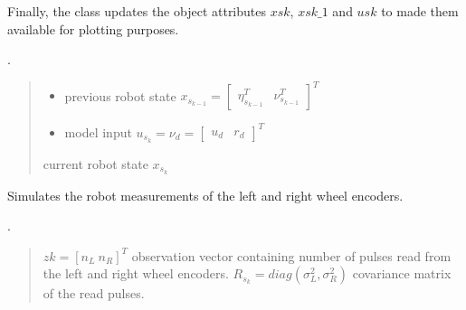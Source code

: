 \documentclass[letterpaper,10pt,english]{sphinxmanual}
\begin{document}
\begin{fulllineitems}
\begin{fulllineitems}
\sphinxAtStartPar
Finally, the class updates the object attributes \(xsk\), \(xsk\_1\) and  \(usk\) to made them available for plotting purposes.

\sphinxAtStartPar
{}.
\begin{quote}\begin{description}
\begin{itemize}
\item {} 
\sphinxAtStartPar
{} \textendash{} previous robot state \(x_{s_{k-1}}=\begin{bmatrix}\eta_{s_{k-1}}^T & \nu_{s_{k-1}}^T\end{bmatrix}^T\)

\item {} 
\sphinxAtStartPar
{} \textendash{} model input \(u_{s_k}=\nu_{d}=\begin{bmatrix} u_d& r_d\end{bmatrix}^T\)

\end{itemize}

\sphinxAtStartPar
current robot state \(x_{s_k}\)

\end{description}\end{quote}

\end{fulllineitems}


\begin{fulllineitems}
\label{\detokenize{robot_simulation:DifferentialDriveSimulatedRobot.DifferentialDriveSimulatedRobot.ReadEncoders}}
\pysigstartsignatures
{}
\pysigstopsignatures
\sphinxAtStartPar
Simulates the robot measurements of the left and right wheel encoders.

\sphinxAtStartPar
{}.
\begin{quote}\begin{description}
\sphinxAtStartPar
\(zk=[n_L~n_R]^T\) observation vector containing number of pulses read from the left and right wheel encoders. \(R_{s_k}=diag(\sigma_L^2,\sigma_R^2)\) covariance matrix of the read pulses.


\end{description}
\end{quote}
\end{fulllineitems}
\end{fulllineitems}
\end{document}
